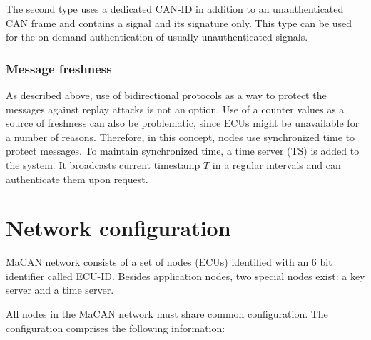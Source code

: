 \documentclass{article}
\begin{document}
The second type uses a dedicated CAN-ID in addition to an unauthenticated CAN frame and contains a signal and its signature only. This type can be used for the on-demand authentication of usually unauthenticated signals.

\subsubsection{Message freshness}

As described above, use of bidirectional protocols as a way to protect the messages against replay attacks is not an option. Use of a counter values as a source of freshness can also be problematic, since ECUs might be unavailable for a number of reasons. Therefore, in this concept, nodes use synchronized time to protect messages. To maintain synchronized time, a time server (TS) is added to the system. It broadcasts current timestamp $T$ in a regular intervals and can authenticate them upon request.

\section{Network configuration}
\label{sec:netw-conf}

MaCAN network consists of a set of nodes (ECUs) identified with an 6 bit identifier called ECU-ID. Besides application nodes, two special nodes exist: a key server and a time server.

All nodes in the MaCAN network must share common configuration. The configuration comprises the following information:
\end{document}
